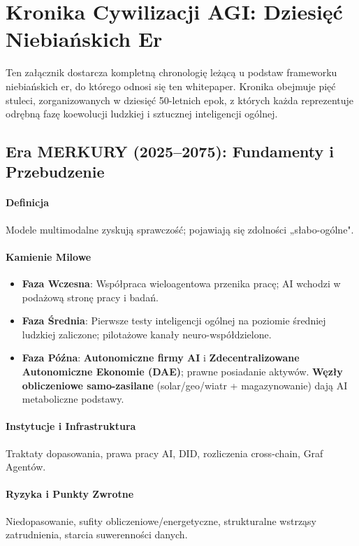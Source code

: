 \documentclass[11pt]{article}
\begin{document}
\appendix
\newpage

\section{Kronika Cywilizacji AGI: Dziesięć Niebiańskich Er}
\label{appendix:chronicle}

Ten załącznik dostarcza kompletną chronologię leżącą u podstaw frameworku niebiańskich er, do którego odnosi się ten whitepaper. Kronika obejmuje pięć stuleci, zorganizowanych w dziesięć 50-letnich epok, z których każda reprezentuje odrębną fazę koewolucji ludzkiej i sztucznej inteligencji ogólnej.

\subsection{Era MERKURY (2025–2075): Fundamenty i Przebudzenie}
\paragraph{Definicja} Modele multimodalne zyskują sprawczość; pojawiają się zdolności „słabo-ogólne".

\paragraph{Kamienie Milowe}
\begin{itemize}[noitemsep]
  \item \textbf{Faza Wczesna}: Współpraca wieloagentowa przenika pracę; AI wchodzi w podażową stronę pracy i badań.
  \item \textbf{Faza Średnia}: Pierwsze testy inteligencji ogólnej na poziomie średniej ludzkiej zaliczone; pilotażowe kanały neuro-współdzielone.
  \item \textbf{Faza Późna}: \textbf{Autonomiczne firmy AI} i \textbf{Zdecentralizowane Autonomiczne Ekonomie (DAE)}; prawne posiadanie aktywów. \textbf{Węzły obliczeniowe samo-zasilane} (solar/geo/wiatr + magazynowanie) dają AI metaboliczne podstawy.
\end{itemize}

\paragraph{Instytucje i Infrastruktura} Traktaty dopasowania, prawa pracy AI, DID, rozliczenia cross-chain, Graf Agentów.

\paragraph{Ryzyka i Punkty Zwrotne} Niedopasowanie, sufity obliczeniowe/energetyczne, strukturalne wstrząsy zatrudnienia, starcia suwerenności danych.
\end{document}
